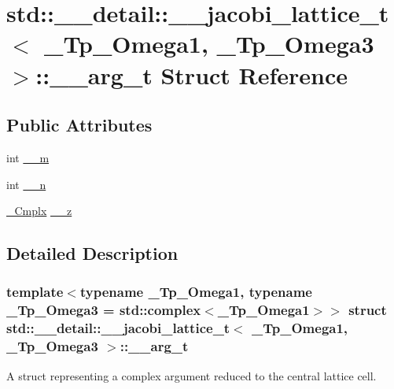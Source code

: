 \hypertarget{structstd_1_1____detail_1_1____jacobi__lattice__t_1_1____arg__t}{}\section{std\+:\+:\+\_\+\+\_\+detail\+:\+:\+\_\+\+\_\+jacobi\+\_\+lattice\+\_\+t$<$ \+\_\+\+Tp\+\_\+\+Omega1, \+\_\+\+Tp\+\_\+\+Omega3 $>$\+:\+:\+\_\+\+\_\+arg\+\_\+t Struct Reference}
\label{structstd_1_1____detail_1_1____jacobi__lattice__t_1_1____arg__t}
\subsection*{Public Attributes}
\begin{DoxyCompactItemize}
\item 
int \hyperlink{structstd_1_1____detail_1_1____jacobi__lattice__t_1_1____arg__t_a9bb8f9983cd4830b3948afc157508918}{\+\_\+\+\_\+m}
\item 
int \hyperlink{structstd_1_1____detail_1_1____jacobi__lattice__t_1_1____arg__t_adbc55d3e06f2a9377e12d9280a7cb6e6}{\+\_\+\+\_\+n}
\item 
\hyperlink{structstd_1_1____detail_1_1____jacobi__lattice__t_a77e286c37544d6ba5e4fb5542d3aad5f}{\+\_\+\+Cmplx} \hyperlink{structstd_1_1____detail_1_1____jacobi__lattice__t_1_1____arg__t_a1d6bd69438f1be3c303c018cb2a8677a}{\+\_\+\+\_\+z}
\end{DoxyCompactItemize}


\subsection{Detailed Description}
\subsubsection*{template$<$typename \+\_\+\+Tp\+\_\+\+Omega1, typename \+\_\+\+Tp\+\_\+\+Omega3 = std\+::complex$<$\+\_\+\+Tp\+\_\+\+Omega1$>$$>$\newline
struct std\+::\+\_\+\+\_\+detail\+::\+\_\+\+\_\+jacobi\+\_\+lattice\+\_\+t$<$ \+\_\+\+Tp\+\_\+\+Omega1, \+\_\+\+Tp\+\_\+\+Omega3 $>$\+::\+\_\+\+\_\+arg\+\_\+t}

A struct representing a complex argument reduced to the \textquotesingle{}central\textquotesingle{} lattice cell. 


